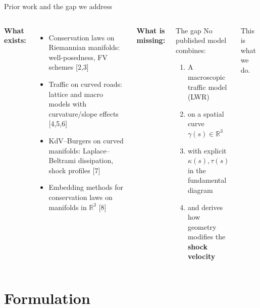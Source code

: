 \documentclass[aspectratio=169,11pt]{beamer}
\newcommand{\mcite}[1]{{\scriptsize\color{Cg}[#1]}}
\begin{document}
\begin{frame}{Prior work and the gap we address}
\begin{columns}[T]
  \medskip
  \textbf{What exists:}
  \begin{itemize}
    \setlength\itemsep{4pt}
    \item Conservation laws on Riemannian manifolds:
          well-posedness, FV schemes
          \mcite{2,3}
    \item Traffic on curved roads: lattice and
          macro models with curvature/slope effects
          \mcite{4,5,6}
    \item KdV--Burgers on curved manifolds:
          Laplace--Beltrami dissipation, shock profiles
          \mcite{7}
    \item Embedding methods for conservation
          laws on manifolds in $\mathbb{R}^3$ \mcite{8}
  \end{itemize}

  \medskip
  \textbf{What is missing:}

  \begin{alertblock}{The gap}
    No published model combines:
    \begin{enumerate}
      \setlength\itemsep{3pt}
      \item A macroscopic traffic model (LWR)
      \item on a spatial curve $\gamma(s) \in \mathbb{R}^3$
      \item with \alert{explicit} $\kappa(s), \tau(s)$
            in the fundamental diagram
      \item and derives how geometry modifies
            the \textbf{shock velocity}
    \end{enumerate}
  \end{alertblock}

  \smallskip
  {\footnotesize This is what we do.}
\end{columns}
\end{frame}

\section{Formulation}
\end{document}
